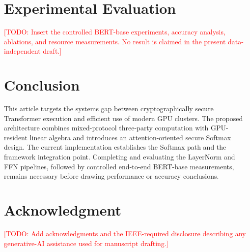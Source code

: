 \documentclass{ieeeaccess}
\newcommand{\todo}[1]{\textcolor{red}{[TODO: #1]}}
\begin{document}
\titlepgskip=-21pt
\maketitle






\section{Experimental Evaluation}
\label{sec:evaluation}
\todo{Insert the controlled BERT-base experiments, accuracy analysis, ablations, and resource measurements. No result is claimed in the present data-independent draft.}

\section{Conclusion}
\label{sec:conclusion}
This article targets the systems gap between cryptographically secure Transformer execution and efficient use of modern GPU clusters. The proposed architecture combines mixed-protocol three-party computation with GPU-resident linear algebra and introduces an attention-oriented secure Softmax design. The current implementation establishes the Softmax path and the framework integration point. Completing and evaluating the LayerNorm and FFN pipelines, followed by controlled end-to-end BERT-base measurements, remains necessary before drawing performance or accuracy conclusions.
\EOD

\section*{Acknowledgment}
\todo{Add acknowledgments and the IEEE-required disclosure describing any generative-AI assistance used for manuscript drafting.}



\end{document}
